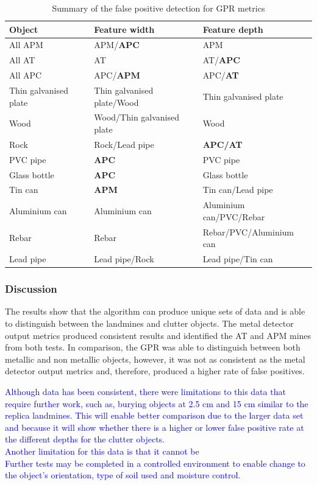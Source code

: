 \documentclass[main.tex]{subfiles}
\begin{document}
\begin{table}[!ht]
\centering
\caption{Summary of the false positive detection for GPR metrics}
\begin{tabular}{lll}
\toprule
Object & Feature width & Feature depth \\ \midrule
All APM & APM/\textbf{APC} & APM \\
All AT & AT & AT/\textbf{APC} \\
All APC & APC/\textbf{APM} & APC/\textbf{AT} \\
Thin galvanised plate & Thin galvanised plate/Wood & Thin galvanised plate \\
Wood & Wood/Thin galvanised plate & Wood \\
Rock & Rock/Lead pipe & \textbf{APC/AT} \\
PVC pipe & \textbf{APC} & PVC pipe \\
Glass bottle & \textbf{APC} & Glass bottle \\
Tin can & \textbf{APM} & Tin can/Lead pipe \\
Aluminium can & Aluminium can & Aluminium can/PVC/Rebar \\
Rebar & Rebar & Rebar/PVC/Aluminium can \\
Lead pipe & Lead pipe/Rock & Lead pipe/Tin can\\ \bottomrule
\end{tabular}
\end{table}

\subsubsection{Discussion}
The results show that the algorithm can produce unique sets of data and is able to distinguish between the landmines and clutter objects. The metal detector output metrics produced consistent results and identified the AT and APM mines from both tests. In comparison, the GPR was able to distinguish between both metallic and non metallic objects, however, it was not as consistent as the metal detector output metrics and, therefore, produced a higher rate of false positives. 

\textcolor{blue}{Although data has been consistent, there were limitations to this data that require further work, such as, burying objects at 2.5 cm and 15 cm similar to the replica landmines. This will enable better comparison due to the larger data set and because it will show whether there is a higher or lower false positive rate at the different depths for the clutter objects. \\
Another limitation for this data is that it cannot be \\
Further tests may be completed in a controlled environment to enable change to the object's orientation, type of soil used and moisture control.
}
\end{document}
